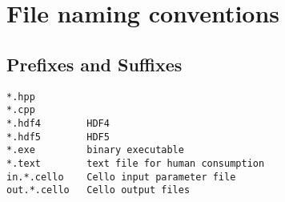 \documentclass{book}
\begin{document}
\chapter{File naming conventions}

\section{Prefixes and Suffixes}

\begin{verbatim}
*.hpp
*.cpp
*.hdf4        HDF4      
*.hdf5        HDF5      
*.exe         binary executable
*.text        text file for human consumption
in.*.cello    Cello input parameter file
out.*.cello   Cello output files
\end{verbatim}
\end{document}
